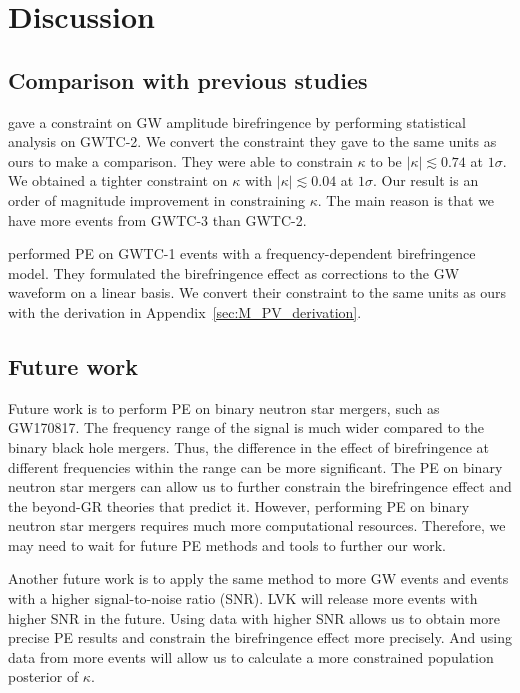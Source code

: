 \documentclass[aps,prd,twocolumn,superscriptaddress,preprintnumbers,floatfix,nofootinbib]{revtex4-2}
\begin{document}
\section{Discussion}
\label{sec:Discussion}

\subsection{Comparison with previous studies}
\citet{Okounkova_2022} gave a constraint on GW amplitude birefringence by performing statistical analysis on GWTC-2.
We convert the constraint they gave to the same units as ours to make a comparison.
They were able to constrain $\kappa$ to be $|\kappa| \lesssim 0.74$ at $1 \sigma$.
We obtained a tighter constraint on $\kappa$ with $|\kappa| \lesssim 0.04$ at $1 \sigma$.
Our result is an order of magnitude improvement in constraining $\kappa$.
The main reason is that we have more events from GWTC-3 than GWTC-2.

\citet{Wang_2021} performed \ac{PE} on GWTC-1 events with a frequency-dependent birefringence model.
They formulated the birefringence effect as corrections to the GW waveform on a linear basis.
We convert their constraint to the same units as ours with the derivation in Appendix~\ref{sec:M_PV_derivation}.

\subsection{Future work}
Future work is to perform \ac{PE} on binary neutron star mergers, such as GW170817.
The frequency range of the signal is much wider compared to the binary black hole mergers.
Thus, the difference in the effect of birefringence at different frequencies within the range can be more significant.
The \ac{PE} on binary neutron star mergers can allow us to further constrain the birefringence effect and the beyond-GR theories that predict it.
However, performing \ac{PE} on binary neutron star mergers requires much more computational resources.
Therefore, we may need to wait for future \ac{PE} methods and tools to further our work.

Another future work is to apply the same method to more GW events and events with a higher signal-to-noise ratio (SNR).
LVK will release more events with higher SNR in the future.
Using data with higher SNR allows us to obtain more precise \ac{PE} results and constrain the birefringence effect more precisely.
And using data from more events will allow us to calculate a more constrained population posterior of $\kappa$.
\end{document}
